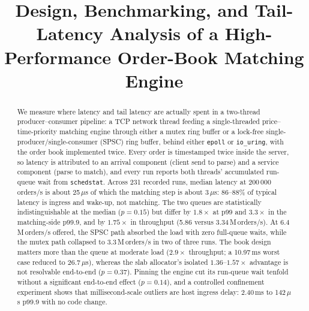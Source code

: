 \documentclass[conference]{IEEEtran}
\newcommand{\us}{\,$\mu$s}
\newcommand{\Mops}{\,M\,orders/s}
\begin{document}
\title{Design, Benchmarking, and Tail-Latency Analysis of a High-Performance
Order-Book Matching Engine}

\author{%
}

\maketitle

\begin{abstract}
We measure where latency and tail latency are actually spent in a two-thread
producer--consumer pipeline: a TCP network thread feeding a single-threaded
price--time-priority matching engine through either a mutex ring buffer or a
lock-free single-producer/single-consumer (SPSC) ring buffer, behind either
\texttt{epoll} or \texttt{io\_uring}, with the order book implemented twice.
Every order is timestamped twice inside the server, so latency is attributed to
an arrival component (client send to parse) and a service component (parse to
match), and every run reports both threads' accumulated run-queue wait from
\texttt{schedstat}. Across 231 recorded runs, median latency at 200\,000
orders/s is about 25\us{} of which the matching step is about 3\us: 86--88\% of
typical latency is ingress and wake-up, not matching. The two queues are
statistically indistinguishable at the median ($p=0.15$) but differ by
$1.8\times$ at p99 and $3.3\times$ in the matching-side p99.9, and by
$1.75\times$ in throughput (5.86 versus 3.34\Mops). At 6.4\Mops{} offered, the
SPSC path absorbed the load with zero full-queue waits, while the mutex path
collapsed to 3.3\Mops{} in two of three runs. The book design matters more than
the queue at moderate load ($2.9\times$ throughput; a 10.97\,ms worst case
reduced to 26.7\us), whereas the slab allocator's isolated
$1.36$--$1.57\times$ advantage is not resolvable end-to-end ($p=0.37$). Pinning
the engine cut its run-queue wait tenfold without a significant end-to-end
effect ($p=0.14$), and a controlled confinement experiment shows that
millisecond-scale outliers are host ingress delay: 2.40\,ms to 142\us{} p99.9
with no code change.
\end{abstract}
\end{document}
